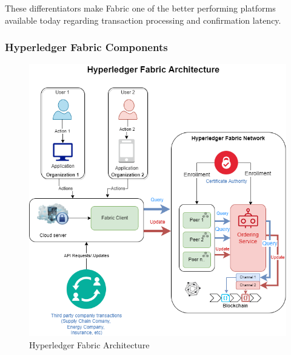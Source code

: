 These differentiators make Fabric one of the better performing platforms available today regarding transaction processing and confirmation latency. 

\subsubsection{Hyperledger Fabric Components}

\begin{figure}[!h]
    \centering
    \includegraphics[width=15cm]{img/Hyperledger_Architecture.png}
    \caption{Hyperledger Fabric Architecture}
    \label{fig:HyperledgerArchitecture}
\end{figure}


